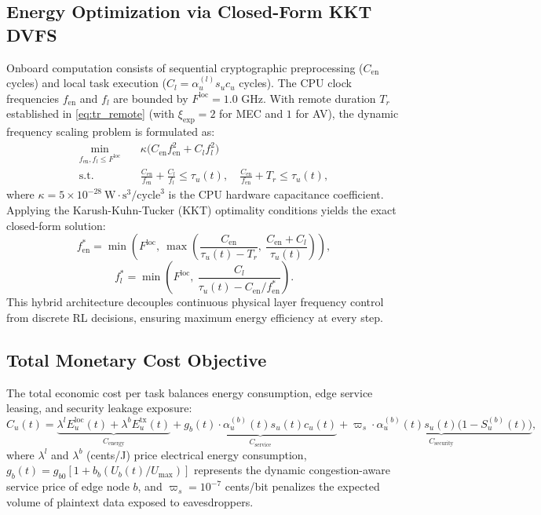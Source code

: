 \documentclass[12pt,a4paper]{article}
\begin{document}
\subsection{Energy Optimization via Closed-Form KKT DVFS}
Onboard computation consists of sequential cryptographic preprocessing ($C_{\mathrm{en}}$ cycles) and local task execution ($C_l = \alpha_u^{(l)} s_u c_u$ cycles). The CPU clock frequencies $f_{\mathrm{en}}$ and $f_l$ are bounded by $F^{\mathrm{loc}} = 1.0$ GHz. With remote duration $T_r$ established in \eqref{eq:tr_remote} (with $\xi_{\mathrm{exp}} = 2$ for MEC and $1$ for AV), the dynamic frequency scaling problem is formulated as:
\begin{equation}
\begin{aligned}
\min_{f_{\mathrm{en}}, f_l \le F^{\mathrm{loc}}} \quad & \kappa \big( C_{\mathrm{en}} f_{\mathrm{en}}^2 + C_l f_l^2 \big) \\
\text{s.t.} \quad & \frac{C_{\mathrm{en}}}{f_{\mathrm{en}}} + \frac{C_l}{f_l} \le \tau_u(t), \quad \frac{C_{\mathrm{en}}}{f_{\mathrm{en}}} + T_r \le \tau_u(t),
\end{aligned}
\label{eq:dvfs_problem}
\end{equation}
where $\kappa = 5 \times 10^{-28} \ \mathrm{W}\cdot\mathrm{s}^3/\mathrm{cycle}^3$ is the CPU hardware capacitance coefficient. Applying the Karush-Kuhn-Tucker (KKT) optimality conditions yields the exact closed-form solution:
\begin{equation}
f_{\mathrm{en}}^* = \min\left( F^{\mathrm{loc}},\ \max\left( \frac{C_{\mathrm{en}}}{\tau_u(t) - T_r},\ \frac{C_{\mathrm{en}} + C_l}{\tau_u(t)} \right) \right),
\label{eq:kkt_fen}
\end{equation}
\begin{equation}
f_l^* = \min\left( F^{\mathrm{loc}},\ \frac{C_l}{\tau_u(t) - C_{\mathrm{en}} / f_{\mathrm{en}}^*} \right).
\label{eq:kkt_fl}
\end{equation}
This hybrid architecture decouples continuous physical layer frequency control from discrete RL decisions, ensuring maximum energy efficiency at every step.

\subsection{Total Monetary Cost Objective}
The total economic cost per task balances energy consumption, edge service leasing, and security leakage exposure:
\begin{equation}
C_u(t) = \underbrace{\lambda^l E_u^{\mathrm{loc}}(t) + \lambda^b E_u^{\mathrm{tx}}(t)}_{C_{\mathrm{energy}}} + \underbrace{g_b(t) \cdot \alpha_u^{(b)}(t) s_u(t) c_u(t)}_{C_{\mathrm{service}}} + \underbrace{\varpi_s \cdot \alpha_u^{(b)}(t) s_u(t) \big(1 - S_u^{(b)}(t)\big)}_{C_{\mathrm{security}}},
\label{eq:total_cost_breakdown}
\end{equation}
where $\lambda^l$ and $\lambda^b$ (cents/J) price electrical energy consumption, $g_b(t) = g_{b0} [1 + b_b (U_b(t)/U_{\max})]$ represents the dynamic congestion-aware service price of edge node $b$, and $\varpi_s = 10^{-7}$ cents/bit penalizes the expected volume of plaintext data exposed to eavesdroppers.
\end{document}
